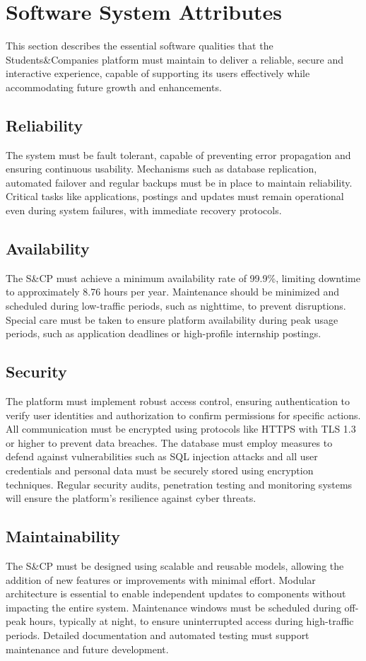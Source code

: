 \section{Software System Attributes}
This section describes the essential software qualities that the Students\&Companies platform must maintain to deliver a reliable, secure and interactive experience, capable of supporting its users effectively while accommodating future growth and enhancements.

\subsection{Reliability}
The system must be fault tolerant, capable of preventing error propagation and ensuring continuous usability.
Mechanisms such as database replication, automated failover and regular backups must be in place to maintain reliability.
Critical tasks like applications, postings and updates must remain operational even during system failures, with immediate recovery protocols.

\subsection{Availability}
The S\&CP must achieve a minimum availability rate of 99.9\%, limiting downtime to approximately 8.76 hours per year.
Maintenance should be minimized and scheduled during low-traffic periods, such as nighttime, to prevent disruptions.
Special care must be taken to ensure platform availability during peak usage periods, such as application deadlines or high-profile internship postings.

\subsection{Security}
The platform must implement robust access control, ensuring authentication to verify user identities and authorization to confirm permissions for specific actions.
All communication must be encrypted using protocols like HTTPS with TLS 1.3 or higher to prevent data breaches.
The database must employ measures to defend against vulnerabilities such as SQL injection attacks and all user credentials and personal data must be securely stored using encryption techniques.
Regular security audits, penetration testing and monitoring systems will ensure the platform's resilience against cyber threats.

\subsection{Maintainability}
The S\&CP must be designed using scalable and reusable models, allowing the addition of new features or improvements with minimal effort.
Modular architecture is essential to enable independent updates to components without impacting the entire system.
Maintenance windows must be scheduled during off-peak hours, typically at night, to ensure uninterrupted access during high-traffic periods.
Detailed documentation and automated testing must support maintenance and future development.

